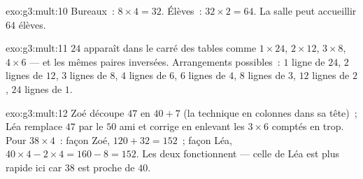 \begin{solution}{exo:g3:mult:10}
Bureaux~: $8 \times 4 = 32$. Élèves~: $32 \times 2 = 64$. La
salle peut accueillir $64$ élèves.
\end{solution}

\begin{solution}{exo:g3:mult:11}
$24$ apparaît dans le carré des tables comme $1 \times 24$,
$2 \times 12$, $3 \times 8$, $4 \times 6$ --- et les mêmes paires
inversées. Arrangements possibles~: $1$ ligne de $24$, $2$ lignes
de $12$, $3$ lignes de $8$, $4$ lignes de $6$, $6$ lignes de $4$,
$8$ lignes de $3$, $12$ lignes de $2$, $24$ lignes de $1$.
\end{solution}

\begin{solution}{exo:g3:mult:12}
Zoé découpe $47$ en $40 + 7$ (la technique en colonnes dans sa
tête)~; Léa remplace $47$ par le $50$ ami et corrige en enlevant
les $3 \times 6$ comptés en trop. Pour $38 \times 4$~: façon
Zoé, $120 + 32 = 152$~; façon Léa,
$40 \times 4 - 2 \times 4 = 160 - 8 = 152$. Les deux fonctionnent ---
celle de Léa est plus rapide ici car $38$ est proche de $40$.
\end{solution}
